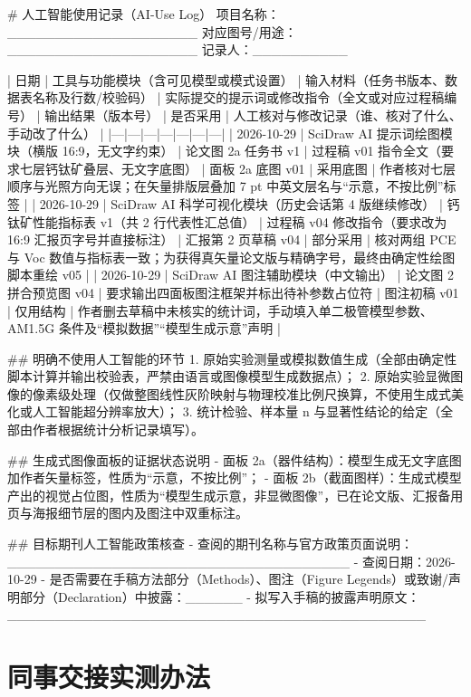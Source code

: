 \begin{Prompt}
# 人工智能使用记录（AI-Use Log）
项目名称：____________________  对应图号/用途：____________________  记录人：__________

| 日期 | 工具与功能模块（含可见模型或模式设置） | 输入材料（任务书版本、数据表名称及行数/校验码） | 实际提交的提示词或修改指令（全文或对应过程稿编号） | 输出结果（版本号） | 是否采用 | 人工核对与修改记录（谁、核对了什么、手动改了什么） |
|---|---|---|---|---|---|---|
| 2026-10-29 | SciDraw AI 提示词绘图模块（横版 16:9，无文字约束） | 论文图 2a 任务书 v1 | 过程稿 v01 指令全文（要求七层钙钛矿叠层、无文字底图） | 面板 2a 底图 v01 | 采用底图 | 作者核对七层顺序与光照方向无误；在矢量排版层叠加 7 pt 中英文层名与“示意，不按比例”标签 |
| 2026-10-29 | SciDraw AI 科学可视化模块（历史会话第 4 版继续修改） | 钙钛矿性能指标表 v1（共 2 行代表性汇总值） | 过程稿 v04 修改指令（要求改为 16:9 汇报页字号并直接标注） | 汇报第 2 页草稿 v04 | 部分采用 | 核对两组 PCE 与 Voc 数值与指标表一致；为获得真矢量论文版与精确字号，最终由确定性绘图脚本重绘 v05 |
| 2026-10-29 | SciDraw AI 图注辅助模块（中文输出） | 论文图 2 拼合预览图 v04 | 要求输出四面板图注框架并标出待补参数占位符 | 图注初稿 v01 | 仅用结构 | 作者删去草稿中未核实的统计词，手动填入单二极管模型参数、AM1.5G 条件及“模拟数据”“模型生成示意”声明 |

## 明确不使用人工智能的环节
1. 原始实验测量或模拟数值生成（全部由确定性脚本计算并输出校验表，严禁由语言或图像模型生成数据点）；
2. 原始实验显微图像的像素级处理（仅做整图线性灰阶映射与物理校准比例尺换算，不使用生成式美化或人工智能超分辨率放大）；
3. 统计检验、样本量 n 与显著性结论的给定（全部由作者根据统计分析记录填写）。

## 生成式图像面板的证据状态说明
- 面板 2a（器件结构）：模型生成无文字底图加作者矢量标签，性质为“示意，不按比例”；
- 面板 2b（截面图样）：生成式模型产出的视觉占位图，性质为“模型生成示意，非显微图像”，已在论文版、汇报备用页与海报细节层的图内及图注中双重标注。

## 目标期刊人工智能政策核查
- 查阅的期刊名称与官方政策页面说明：____________________________________
- 查阅日期：2026-10-29
- 是否需要在手稿方法部分（Methods）、图注（Figure Legends）或致谢/声明部分（Declaration）中披露：______
- 拟写入手稿的披露声明原文：____________________________________________
\end{Prompt}

\section{同事交接实测办法}

